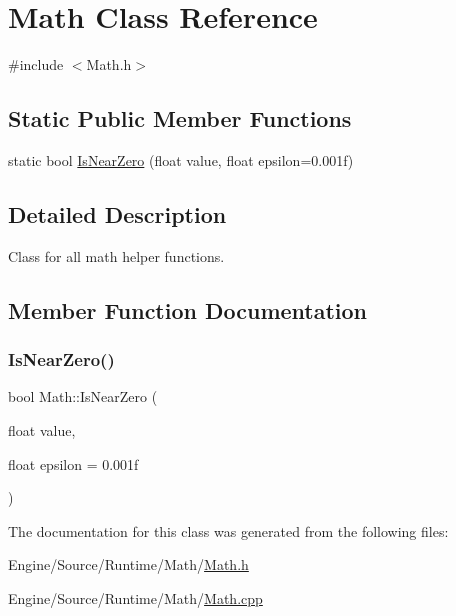 \hypertarget{class_math}{}\section{Math Class Reference}
\label{class_math}


{\ttfamily \#include $<$Math.\+h$>$}

\subsection*{Static Public Member Functions}
\begin{DoxyCompactItemize}
\item 
static bool \mbox{\hyperlink{class_math_a390863eeb33d7fce8e7257169684845e}{Is\+Near\+Zero}} (float value, float epsilon=0.\+001f)
\end{DoxyCompactItemize}


\subsection{Detailed Description}
Class for all math helper functions. 

\subsection{Member Function Documentation}
\mbox{\label{class_math_a390863eeb33d7fce8e7257169684845e}} 
\subsubsection{\texorpdfstring{Is\+Near\+Zero()}{IsNearZero()}}
{\footnotesize\ttfamily bool Math\+::\+Is\+Near\+Zero (\begin{DoxyParamCaption}\item[{float}]{value,  }\item[{float}]{epsilon = {\ttfamily 0.001f} }\end{DoxyParamCaption})\hspace{0.3cm}{\ttfamily [static]}}



The documentation for this class was generated from the following files\+:\begin{DoxyCompactItemize}
\item 
Engine/\+Source/\+Runtime/\+Math/\mbox{\hyperlink{_math_8h}{Math.\+h}}\item 
Engine/\+Source/\+Runtime/\+Math/\mbox{\hyperlink{_math_8cpp}{Math.\+cpp}}\end{DoxyCompactItemize}
